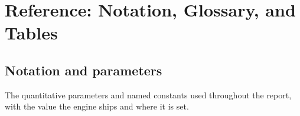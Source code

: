 \documentclass[11pt,a4paper,oneside]{report}
\theoremstyle{sirixthm}
\begin{document}
\printbibliography[heading=bibintoc,title={References},prenote=refsnote]


\chapter{Reference: Notation, Glossary, and Tables}
\label{app:reference}

\section{Notation and parameters}
\label{app:notation}


The quantitative parameters and named constants used throughout the report, with the value the engine
ships and where it is set.
\end{document}
